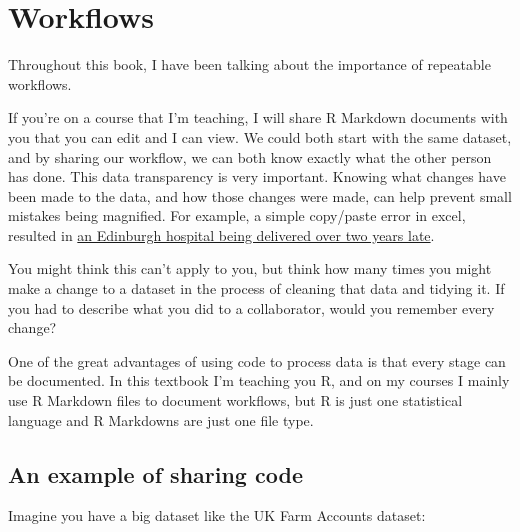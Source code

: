 \documentclass[
]{book}
\begin{document}
\hypertarget{workflows}{%
\section{Workflows}\label{workflows}}

Throughout this book, I have been talking about the importance of repeatable workflows.

If you're on a course that I'm teaching, I will share R Markdown documents with you that you can edit and I can view. We could both start with the same dataset, and by sharing our workflow, we can both know exactly what the other person has done. This data transparency is very important. Knowing what changes have been made to the data, and how those changes were made, can help prevent small mistakes being magnified. For example, a simple copy/paste error in excel, resulted in \href{https://www.bbc.co.uk/news/uk-scotland-edinburgh-east-fife-53893101}{an Edinburgh hospital being delivered over two years late}.

You might think this can't apply to you, but think how many times you might make a change to a dataset in the process of cleaning that data and tidying it. If you had to describe what you did to a collaborator, would you remember every change?

One of the great advantages of using code to process data is that every stage can be documented. In this textbook I'm teaching you R, and on my courses I mainly use R Markdown files to document workflows, but R is just one statistical language and R Markdowns are just one file type.

\hypertarget{an-example-of-sharing-code}{%
\subsection{An example of sharing code}\label{an-example-of-sharing-code}}

Imagine you have a big dataset like the UK Farm Accounts dataset:
\end{document}
